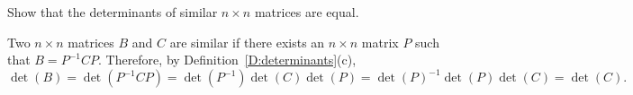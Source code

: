 \documentclass{ximera}
\begin{document}
\begin{exercise} \label{c10.1.3}
Show that the determinants of similar $n\times n$ matrices are
equal. 

\begin{solution}

Two $n \times n$ matrices $B$ and $C$ are similar if there exists
an $n \times n$ matrix $P$ such that $B = P^{-1}CP$.  Therefore, by
Definition~\ref{D:determinants}(c),
\[
\det(B) = \det(P^{-1}CP)
= \det(P^{-1})\det(C)\det(P)
= \det(P)^{-1}\det(P)\det(C)
= \det(C).
\]

\end{solution}
\end{exercise}
\end{document}
